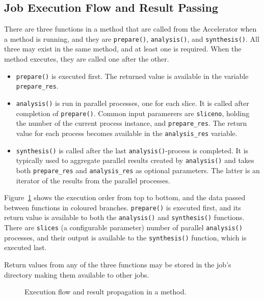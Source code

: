 \documentclass[a4paper]{article}
\begin{document}
\subsection{Job Execution Flow and Result Passing}

There are three functions in a method that are called from the
Accelerator when a method is running, and they are \texttt{prepare()},
\texttt{analysis()}, and \texttt{synthesis()}.  All three may exist in
the same method, and at least one is required.  When the method
executes, they are called one after the other.
\begin{itemize}
\item[] \texttt{prepare()} is executed first.  The returned value is
  available in the variable \texttt{prepare\_res}.
\item[] \texttt{analysis()} is run in parallel processes, one for each
  slice.  It is called after completion of \texttt{prepare()}.  Common
  input paramerers are \texttt{sliceno}, holding the number of the
  current process instance, and \texttt{prepare\_res}.  The return
  value for each process becomes available in the
  \texttt{analysis\_res} variable.
\item[] \texttt{synthesis()} is called after the last
  \texttt{analysis()}-process is completed.  It is typically used to
  aggregate parallel results created by \texttt{analysis()} and takes
  both \texttt{prepare\_res} and \texttt{analysis\_res} as optional
  parameters.  The latter is an iterator of the results from the
  parallel processes.
\end{itemize}
Figure~\ref{fig:prepanasyn} shows the execution order from top to
bottom, and the data passed between functions in coloured branches.
\texttt{prepare()} is executed first, and its return value is
available to both the \texttt{analysis()} and \texttt{synthesis()}
functions.  There are \texttt{slices} (a configurable parameter)
number of parallel \texttt{analysis()} processes, and their output is
available to the \texttt{synthesis()} function, which is executed
last.

Return values from any of the three functions may be stored in the
job's directory making them available to other jobs.


\begin{figure}[h!]
  \begin{center}
    
    \caption{Execution flow and result propagation in a method.}
    \label{fig:prepanasyn}
  \end{center}
\end{figure}
\end{document}
